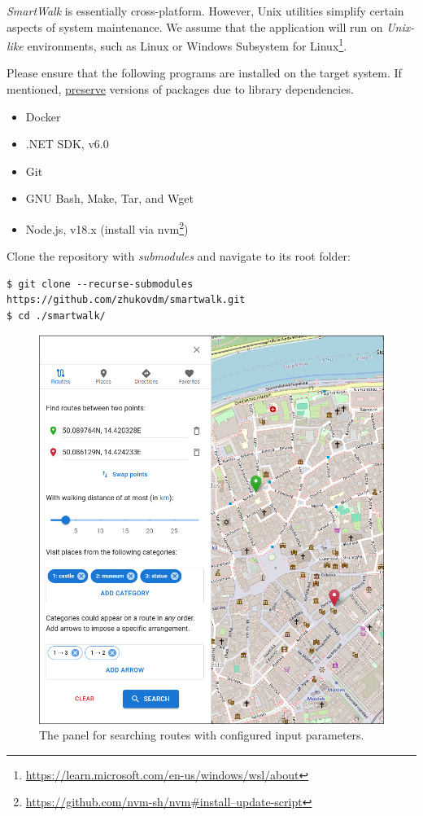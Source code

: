 \emph{SmartWalk} is essentially cross-platform. However, Unix utilities simplify certain aspects of system maintenance. We assume that the application will run on \emph{Unix-like} environments, such as Linux or Windows Subsystem for Linux\footnote{\href{https://learn.microsoft.com/en-us/windows/wsl/about}{https://learn.microsoft.com/en-us/windows/wsl/about}}.

Please ensure that the following programs are installed on the target system. If mentioned, \underline{preserve} versions of packages due to library dependencies.

\begin{itemize}
\item Docker
\item .NET SDK, v6.0
\item Git
\item GNU Bash, Make, Tar, and Wget
\item Node.js, v18.x (install via nvm\footnote{\href{https://github.com/nvm-sh/nvm\#install--update-script}{https://github.com/nvm-sh/nvm\#install--update-script}})
\end{itemize}

Clone the repository with \emph{submodules} and navigate to its root folder:

\begin{verbatim}
$ git clone --recurse-submodules https://github.com/zhukovdm/smartwalk.git
$ cd ./smartwalk/
\end{verbatim}

\clearpage

\begin{figure}
  \centering
  \includegraphics[width=1.00\linewidth]{img/attach/uc04-search-routes-config.png}
  \caption{The panel for searching routes with configured input parameters.}
  \label{fig:uc04-search-routes-config}
\end{figure}

